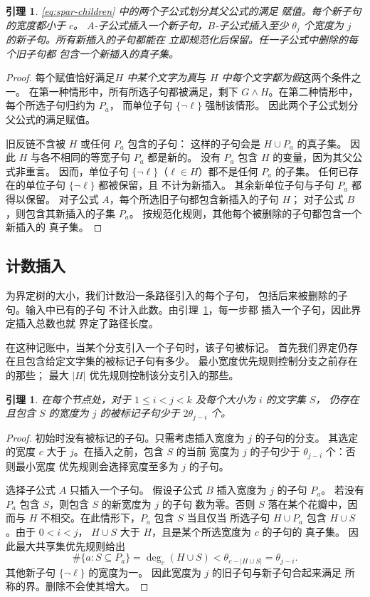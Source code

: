 \documentclass[11pt,reqno]{amsart}
\numberwithin{equation}{section}
\newtheorem{lemma}[theorem]{引理}
\theoremstyle{definition}\newtheorem{definition}[theorem]{定义}
\theoremstyle{remark}\newtheorem{remark}[theorem]{注}
\renewcommand{\le}{\leqslant}
\begin{document}
\begin{lemma}\label{lem:spar-branch}
\eqref{eq:spar-children} 中的两个子公式划分其父公式的满足
赋值。每个新子句的宽度都小于 $c$。
$A$-子公式插入一个新子句，$B$-子公式插入至少
$\theta_j$ 个宽度为 $j$ 的新子句。所有新插入的子句都能在
立即规范化后保留。任一子公式中删除的每个旧子句都
包含一个新插入的真子集。
\end{lemma}
\begin{proof}
每个赋值恰好满足\emph{$H$ 中某个文字为真}与
\emph{$H$ 中每个文字都为假}这两个条件之一。
在第一种情形中，所有所选子句都被满足，剩下
$G\wedge H$。在第二种情形中，每个所选子句归约为 $P_a$，
而单位子句 $\{\neg\ell\}$ 强制该情形。
因此两个子公式划分父公式的满足赋值。

旧反链不含被 $H$ 或任何 $P_a$ 包含的子句：
这样的子句会是 $H\cup P_a$ 的真子集。
因此 $H$ 与各不相同的等宽子句 $P_a$ 都是新的。
没有 $P_a$ 包含 $H$ 的变量，因为其父公式非重言。
因而，单位子句 $\{\neg\ell\}$（$\ell\in H$）都不是任何 $P_a$
的子集。
任何已存在的单位子句 $\{\neg\ell\}$ 都被保留，且
不计为新插入。
其余新单位子句与子句 $P_a$ 都得以保留。
对子公式 $A$，每个所选旧子句都包含新插入的子句 $H$；
对子公式 $B$，则包含其新插入的子集 $P_a$。
按规范化规则，其他每个被删除的子句都包含一个新插入的
真子集。
\end{proof}

\subsection{计数插入}
为界定树的大小，我们计数沿一条路径引入的每个子句，
包括后来被删除的子句。输入中已有的子句
不计入此数。由引理~\ref{lem:spar-branch}，每一步都
插入一个子句，因此界定插入总数也就
界定了路径长度。

在这种记账中，当某个分支引入一个子句时，该子句被标记。
首先我们界定仍存在且包含给定文字集的被标记子句有多少。
最小宽度优先规则控制分支之前存在的那些；
最大 $|H|$ 优先规则控制该分支引入的那些。

\begin{lemma}\label{lem:spar-marked-degree}
在每个节点处，对于 $1\le i<j<k$ 及每个大小为 $i$ 的文字集 $S$，
仍存在且包含 $S$ 的宽度为 $j$ 的被标记子句少于
$2\theta_{j-i}$ 个。
\end{lemma}
\begin{proof}
初始时没有被标记的子句。只需考虑插入宽度为 $j$ 的子句的分支。
其选定的宽度 $c$ 大于 $j$。在插入之前，包含 $S$ 的当前
宽度为 $j$ 的子句少于 $\theta_{j-i}$ 个：否则最小宽度
优先规则会选择宽度至多为 $j$ 的子句。

选择子公式 $A$ 只插入一个子句。
假设子公式 $B$ 插入宽度为 $j$ 的子句 $P_a$。
若没有 $P_a$ 包含 $S$，则包含 $S$ 的新宽度为 $j$ 的子句
数为零。否则 $S$ 落在某个花瓣中，因而与
$H$ 不相交。在此情形下，$P_a$ 包含 $S$ 当且仅当
所选子句 $H\cup P_a$ 包含 $H\cup S$。由于 $0<i<j$，
$H\cup S$ 大于 $H$，且是某个所选宽度为 $c$ 的子句的
真子集。
因此最大共享集优先规则给出
\[
 \#\{a:S\subseteq P_a\}
 =\deg_c(H\cup S)<\theta_{c-|H\cup S|}
 =\theta_{j-i}.
\]
其他新子句 $\{\neg\ell\}$ 的宽度为一。
因此宽度为 $j$ 的旧子句与新子句合起来满足
所称的界。删除不会使其增大。
\end{proof}
\end{document}

